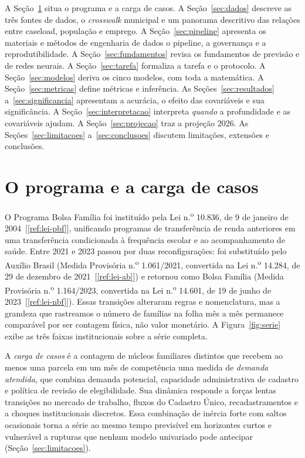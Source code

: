 \documentclass[12pt,a4paper,oneside]{article}
\newcommand{\C}[1]{[\ref{#1}]}
\begin{document}
A Seção~\ref{sec:contexto} situa o programa e a carga de casos. A
Seção~\ref{sec:dados} descreve as três fontes de dados, o \emph{crosswalk}
municipal e um panorama descritivo das relações entre caseload, população
e emprego. A Seção~\ref{sec:pipeline} apresenta os materiais e métodos de
engenharia de dados \textemdash{} o pipeline, a governança e a
reprodutibilidade. A Seção~\ref{sec:fundamentos} revisa os fundamentos de
previsão e de redes neurais. A Seção~\ref{sec:tarefa} formaliza a tarefa e o
protocolo. A Seção~\ref{sec:modelos} deriva os cinco modelos, com toda a
matemática. A Seção~\ref{sec:metricas} define métricas e inferência. As
Seções~\ref{sec:resultados} a~\ref{sec:significancia} apresentam a
acurácia, o efeito das covariáveis e sua significância. A
Seção~\ref{sec:interpretacao} interpreta \emph{quando} a profundidade e as
covariáveis ajudam. A Seção~\ref{sec:projecao} traz a projeção
2026. As Seções~\ref{sec:limitacoes}
a~\ref{sec:conclusoes} discutem limitações, extensões e conclusões.

\section{O programa e a carga de casos}
\label{sec:contexto}

O Programa Bolsa Família foi instituído pela Lei n.\textsuperscript{o}
10.836, de 9 de janeiro de 2004~\C{ref:lei-pbf}, unificando programas de
transferência de renda anteriores em uma transferência condicionada à
frequência escolar e ao acompanhamento de saúde. Entre 2021 e 2023 passou
por duas reconfigurações: foi substituído pelo Auxílio Brasil (Medida
Provisória n.\textsuperscript{o} 1.061/2021, convertida na Lei
n.\textsuperscript{o} 14.284, de 29 de dezembro de 2021~\C{ref:lei-ab}) e
retornou como Bolsa Família (Medida Provisória n.\textsuperscript{o}
1.164/2023, convertida na Lei n.\textsuperscript{o} 14.601, de 19 de junho
de 2023~\C{ref:lei-nbf}). Essas transições alteraram regras e
nomenclatura, mas a grandeza que rastreamos \textemdash{} o número de
famílias na folha mês a mês \textemdash{} permanece comparável por ser
contagem física, não valor monetário. A Figura~\ref{fig:serie} exibe as
três faixas institucionais sobre a série completa.

A \emph{carga de casos} é a contagem de núcleos familiares distintos que
recebem ao menos uma parcela em um mês de competência \textemdash{} uma
medida de \emph{demanda atendida}, que combina demanda potencial,
capacidade administrativa de cadastro e política de revisão de
elegibilidade. Sua dinâmica responde a forças lentas \textemdash{}
transições no mercado de trabalho, fluxos do Cadastro Único,
recadastramentos \textemdash{} e a choques institucionais discretos. Essa
combinação de inércia forte com saltos ocasionais torna a série ao mesmo
tempo previsível em horizontes curtos e vulnerável a rupturas que nenhum
modelo univariado pode antecipar (Seção~\ref{sec:limitacoes}).
\end{document}
